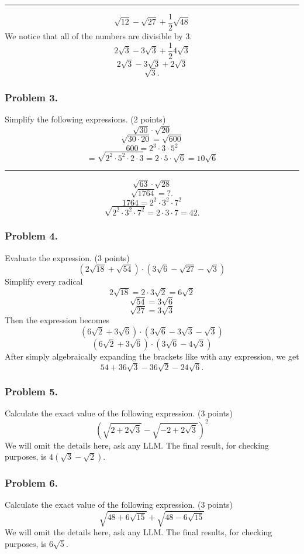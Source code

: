 \documentclass{article}
\begin{document}
\vspace{3pt}
\hrule
\vspace{8pt}

\[
\sqrt{12} - \sqrt{27} + \frac{1}{2}\sqrt{48}
\]
We notice that all of the numbers are divisible by 3.
\[
2\sqrt{3}  - 3\sqrt{3} + \frac{1}{2}4\sqrt{3}
\]
\[
2\sqrt{3} - 3\sqrt{3} + 2\sqrt{3}
\]
\[
\sqrt{3}.
\]

\subsubsection{Problem 3.}
Simplify the following expressions. (2 points)
\[
\sqrt{30}\cdot\sqrt{20}
\]
\[
\sqrt{30 \cdot 20} = \sqrt{600}
\]
\[
600 = 2^3 \cdot 3 \cdot 5^2
\]
\[
=\sqrt{2^2 \cdot 5^2 \cdot 2 \cdot 3} = 2 \cdot 5 \cdot \sqrt{6} = 10\sqrt{6}
\]

\vspace{3pt}
\hrule
\vspace{8pt}

\[
\sqrt{63}\cdot\sqrt{28}
\]
\[
\sqrt{1764} = ?.
\]
\[
1764 = 2^2\cdot3^2\cdot7^2
\]
\[
\sqrt{2^2\cdot3^2\cdot7^2} = 2\cdot3\cdot7 = 42.
\]

\subsubsection{Problem 4.}
Evaluate the expression. (3 points)
\[
(2\sqrt{18} + \sqrt{54})\cdot(3\sqrt{6}-\sqrt{27}-\sqrt{3})
\]
Simplify every radical
\[
2\sqrt{18} = 2\cdot3\sqrt{2}=6\sqrt{2}
\]
\[
\sqrt{54} = 3\sqrt{6}
\]
\[
\sqrt{27} = 3\sqrt{3}
\]
Then the expression becomes
\[
(6\sqrt{2} + 3\sqrt{6}) \cdot (3\sqrt{6} - 3\sqrt{3} - \sqrt{3})
\]
\[
(6\sqrt{2} + 3\sqrt{6}) \cdot (3\sqrt{6} - 4\sqrt{3})
\]
After simply algebraically expanding the brackets like with any expression, we get
\[
54 + 36\sqrt{3} - 36\sqrt{2} - 24\sqrt{6}.
\]

\subsubsection{Problem 5.}
Calculate the exact value of the following expression. (3 points)
\[
(\sqrt{2 + 2\sqrt{3}} - \sqrt{-2 +2\sqrt{3}})^2
\]
We will omit the details here, ask any LLM.
The final result, for checking purposes, is $4(\sqrt{3} - \sqrt{2})$.

\subsubsection{Problem 6.}
Calculate the exact value of the following expression. (3 points)
\[
\sqrt{48  + 6\sqrt{15}} + \sqrt{48 - 6\sqrt{15}}
\]
We will omit the details here, ask any LLM. The final results, for checking purposes, is $6\sqrt{5}.$
\end{document}
